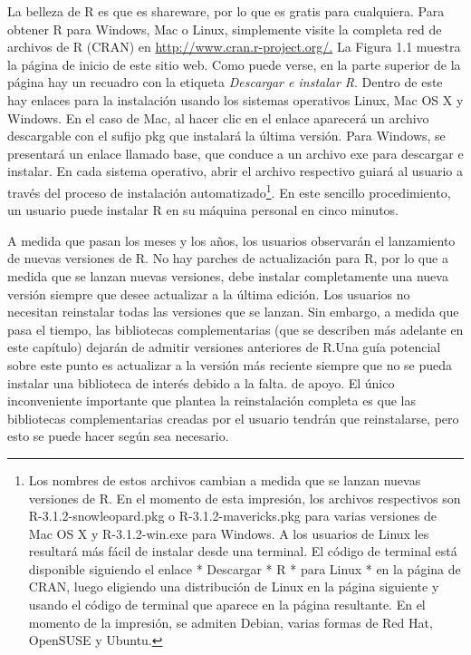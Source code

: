 \documentclass[
]{book}
\begin{document}
La belleza de R es que es shareware, por lo que es gratis para cualquiera. Para obtener R para Windows, Mac o Linux, simplemente visite la completa red de archivos de R (CRAN) en \href{http://www.cran.r-\%20project.org/}{http://www.cran.r-project.org/.} La Figura 1.1 muestra la página de inicio de este sitio web. Como puede verse, en la parte superior de la página hay un recuadro con la etiqueta \emph{Descargar e instalar R}. Dentro de este hay enlaces para la instalación usando los sistemas operativos Linux, Mac OS X y Windows. En el caso de Mac, al hacer clic en el enlace aparecerá un archivo descargable con el sufijo pkg que instalará la última versión. Para Windows, se presentará un enlace llamado base, que conduce a un archivo exe para descargar e instalar. En cada sistema operativo, abrir el archivo respectivo guiará al usuario a través del proceso de instalación automatizado\footnote{Los nombres de estos archivos cambian a medida que se lanzan nuevas versiones de R. En el momento de esta impresión, los archivos respectivos son R-3.1.2-snowleopard.pkg o R-3.1.2-mavericks.pkg para varias versiones de Mac OS X y R-3.1.2-win.exe para Windows. A los usuarios de Linux les resultará más fácil de instalar desde una terminal. El código de terminal está disponible siguiendo el enlace * Descargar * R * para Linux * en la página de CRAN, luego eligiendo una distribución de Linux en la página siguiente y usando el código de terminal que aparece en la página resultante. En el momento de la impresión, se admiten Debian, varias formas de Red Hat, OpenSUSE y Ubuntu.}. En este sencillo procedimiento, un usuario puede instalar R en su máquina personal en cinco minutos.

A medida que pasan los meses y los años, los usuarios observarán el lanzamiento de nuevas versiones de R. No hay parches de actualización para R, por lo que a medida que se lanzan nuevas versiones, debe instalar completamente una nueva versión siempre que desee actualizar a la última edición. Los usuarios no necesitan reinstalar todas las versiones que se lanzan. Sin embargo, a medida que pasa el tiempo, las bibliotecas complementarias (que se describen más adelante en este capítulo) dejarán de admitir versiones anteriores de R.Una guía potencial sobre este punto es actualizar a la versión más reciente siempre que no se pueda instalar una biblioteca de interés debido a la falta. de apoyo. El único inconveniente importante que plantea la reinstalación completa es que las bibliotecas complementarias creadas por el usuario tendrán que reinstalarse, pero esto se puede hacer según sea necesario.
\end{document}
